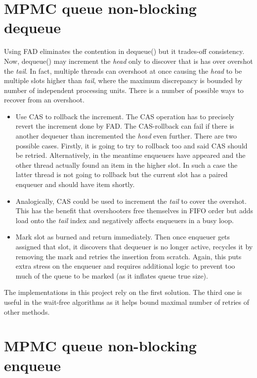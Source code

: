 \documentclass[12pt,a4paper,twoside]{report}
\begin{document}
\section{MPMC queue non-blocking dequeue}
\label{section:mpmc_non_blocking_dequeue}

Using FAD eliminates the contention in dequeue() but it trades-off consistency. Now, dequeue() may increment the \textit{head} only to discover that is has over overshot the \textit{tail}. In fact, multiple threads can overshoot at once causing the \textit{head} to be multiple slots higher than \textit{tail}, where the maximum discrepancy is bounded by number of independent processing units. There is a number of possible ways to recover from an overshoot.

\begin{itemize}
    \item Use CAS to rollback the increment. The CAS operation has to precisely revert the increment done by FAD. The CAS-rollback can fail if there is another dequeuer than incremented the \textit{head} even further. There are two possible cases. Firstly, it is going to try to rollback too and said CAS should be retried. Alternatively, in the meantime enqueuers have appeared and the other thread actually found an item in the higher slot. In such a case the latter thread is not going to rollback but the current slot has a paired enqueuer and should have item shortly. 
    \item Analogically, CAS could be used to increment the \textit{tail} to cover the overshot. This has the benefit that overshooters free themselves in FIFO order but adds load onto the \textit{tail} index and negatively affects enqueuers in a busy loop.
    \item Mark slot as burned and return immediately. Then once enqueuer gets assigned that slot, it discovers that dequeuer is no longer active, recycles it by removing the mark and retries the insertion from scratch. Again, this puts extra stress on the enqueuer and requires additional logic to prevent too much of the queue to be marked (as it inflates queue true size).  
\end{itemize}

The implementations in this project rely on the first solution. The third one is useful in the wait-free algorithms as it helps bound maximal number of retries of other methods. 

\section{MPMC queue non-blocking enqueue}
\end{document}
